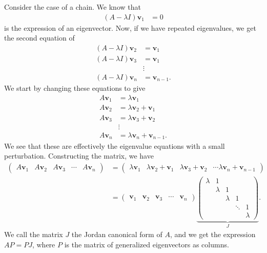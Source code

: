\documentclass[10pt]{mypackage}
\begin{document}
\begin{example}
  Consider the case of a chain. We know that
  \begin{align*}
    \left( A -\lambda I \right)\mathbf{v}_1 &= 0
  \end{align*}
  is the expression of an eigenvector. Now, if we have repeated eigenvalues, we get the second equation of
  \begin{align*}
    \left( A - \lambda I \right)\mathbf{v}_2 &= \mathbf{ v }_1\\
    \left( A - \lambda I \right)\mathbf{v}_3 &= \mathbf{v}_1\\
                                             &\vdots\\
    \left( A - \lambda I \right)\mathbf{v}_{n} &= \mathbf{v}_{n-1}.
  \end{align*}
  We start by changing these equations to give
  \begin{align*}
    A\mathbf{v}_1 &= \lambda\mathbf{v}_1 \\
    A \mathbf{v}_2 &= \lambda \mathbf{v}_2 + \mathbf{v}_1\\
    A\mathbf{v}_3 &= \lambda \mathbf{v}_3 + \mathbf{v}_2\\
                  &\vdots\\
    A\mathbf{v}_n &= \lambda \mathbf{v}_n + \mathbf{v}_{n-1}.
  \end{align*}
  We see that these are effectively the eigenvalue equations with a small perturbation. Constructing the matrix, we have
  \begin{align*}
    \begin{pmatrix}A \mathbf{v}_1 & A\mathbf{v}_2 & A\mathbf{v}_3 & \cdots & A\mathbf{v}_n\end{pmatrix} &= \begin{pmatrix}\lambda \mathbf{v}_1 & \lambda \mathbf{v}_2 + \mathbf{v}_1 & \lambda \mathbf{v}_3 + \mathbf{v}_2 & \cdots \lambda \mathbf{v}_n + \mathbf{v}_{n-1}\end{pmatrix}\\
                                  &= \begin{pmatrix}\mathbf{v}_1 & \mathbf{v}_2 & \mathbf{v}_3 & \cdots & \mathbf{v}_n\end{pmatrix}  \underbrace{\begin{pmatrix} \lambda & 1 &  &  &  \\ & \lambda & 1 &  &  \\&  & \lambda & 1 &  \\ &  &  & \ddots & 1 \\&  &  &  & \lambda \end{pmatrix}}_{J}.
  \end{align*}
  We call the matrix $J$ the Jordan canonical form of $A$, and we get the expression $AP = PJ$, where $P$ is the matrix of generalized eigenvectors as columns.\newline


\end{example}
\end{document}
